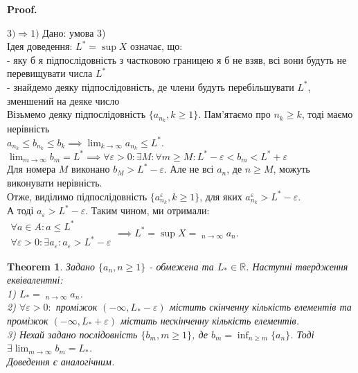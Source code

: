 \documentclass[a4paper, 14pt]{article}
\makeatletter
\DeclareMathOperator*\uplim{\overline{lim}}
\DeclareMathOperator*\downlim{\underline{lim}}
\def\qed{$\blacksquare$}
\theoremstyle{theoremdd}
\newtheorem{theorem}{Theorem}[subsection]
\theoremstyle{theoremdd}
\theoremstyle{theoremdd}
\theoremstyle{theoremdd}
\theoremstyle{theoremdd}
\theoremstyle{theoremdd}
\theoremstyle{theoremdd}
\theoremstyle{theoremdd}
\renewenvironment{proof}[1][Proof.\\]{\par
\pushQED{\hfill \qed}%
\normalfont \topsep6\p@\@plus6\p@\relax
\trivlist
\item\relax
{\bfseries
#1\@addpunct{.}}\hspace\labelsep\ignorespaces
}{%
\popQED\endtrivlist\@endpefalse
}
\makeatother
\begin{document}
\begin{proof}
	$\boxed{3) \Rightarrow 1)}$ Дано: умова 3)\\
	Ідея доведення: $L^* = \sup X$ означає, що:\\
	- яку б я підпослідовність з частковою границею я б не взяв, всі вони будуть не перевищувати числа $L^*$\\
	- знайдемо деяку підпослідовність, де члени будуть перебільшувати $L^*$, зменшений на деяке число\\
	Візьмемо деяку підпослідовність $\{a_{n_k}, k \geq 1\}$. Пам'ятаємо про $n_k \geq k$, тоді маємо нерівність \\ $a_{n_k} \leq b_{n_k} \leq b_k \implies \displaystyle \lim_{k \to \infty} a_{n_k} \leq L^*$.\\
	$\displaystyle \lim_{m \to \infty} b_m = L^* \implies \forall \varepsilon > 0: \exists M: \forall m \geq M: L^*-\varepsilon < b_m < L^*+\varepsilon$\\
	Для номера $M$ виконано $b_M > L^*-\varepsilon$. Але не всі $a_n$, де $n \geq M$, можуть виконувати нерівність.\\
	Отже, виділимо підпослідовність $\{a_{n_k}^{\varepsilon}, k \geq 1\}$, для яких
	$a_{n_k}^{\varepsilon} > L^* - \varepsilon$.\\
	А тоді $a_{\varepsilon} > L^* - \varepsilon$.
	Таким чином, ми отримали:\\
	$\begin{gathered}
	\forall a \in A: a \leq L^* \\
	\forall \varepsilon > 0: \exists a_{\varepsilon}: a_{\varepsilon} > L^* - \varepsilon
	\end{gathered} \implies L^* = \displaystyle \sup X = \uplim_{n \to \infty} a_n$.
	\end{proof}
	
	\begin{theorem}
	Задано $\{a_n, n \geq 1\}$ - обмежена та $L_* \in \mathbb{R}$. Наступні твердження еквівалентні:\\
	1) $L_* = \displaystyle \downlim_{n \to \infty} a_n$.\\
	2) $\forall \varepsilon > 0:$ проміжок $(-\infty,  L_*-\varepsilon)$ містить скінченну кількість елементів та проміжок $(-\infty,  L_*+\varepsilon)$ містить нескінченну кількість елементів.\\
	3) Нехай задано послідовність $\{b_m, m \geq 1\}$, де $b_m = \displaystyle \inf_{n \geq m} \{a_n\}$. Тоді $\exists \displaystyle \lim_{m \to \infty} b_m = L_*$.\\
	\textit{Доведення є аналогічним.}
	\end{theorem}
	
\end{document}
